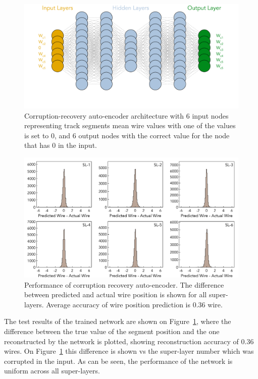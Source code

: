  \begin{figure}[!ht]
\begin{center}
\includegraphics[width=4.5in]{images/aue_diagram.pdf}
\caption {Corruption-recovery auto-encoder architecture with 6 input nodes representing track segments mean wire values with one of the values is set to 0, and 6 output nodes with the correct value for the node that has 0 in the input. }
 \label{autoencoder:architecture}
 \end{center}
\end{figure}

 \begin{figure}[!ht]
\begin{center}
\includegraphics[width=6.0in]{images/encoder_performance.pdf}
\caption {Performance of corruption recovery auto-encoder. The difference between predicted and actual wire position 
is shown for all super-layers. Average accuracy of wire position prediction is  $0.36$ wire.}
 \label{autoencoder:performance}
 \end{center}
\end{figure}
The test results of the trained network are shown on Figure~\ref{autoencoder:architecture}, where the difference between the true value 
of the segment position and the one reconstructed by the network is plotted, showing reconstruction accuracy of $0.36$ wires.
On Figure~\ref{autoencoder:architecture} this difference is shown vs the super-layer number which was corrupted in the input.
As can be seen, the performance of the network is uniform across all super-layers.



